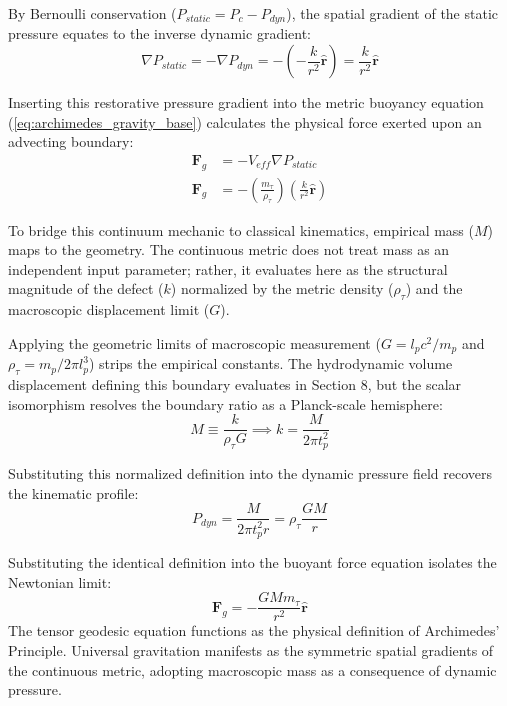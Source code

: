 By Bernoulli conservation ($P_{static} = P_c - P_{dyn}$), the spatial gradient of the static pressure equates to the inverse dynamic gradient:
\begin{equation}
    \nabla P_{static} = -\nabla P_{dyn} = - \left( -\frac{k}{r^2} \mathbf{\hat{r}} \right) = \frac{k}{r^2} \mathbf{\hat{r}}
\end{equation}

Inserting this restorative pressure gradient into the metric buoyancy equation (\ref{eq:archimedes_gravity_base}) calculates the physical force exerted upon an advecting boundary:
\begin{align}
    \mathbf{F}_g &= - V_{eff} \nabla P_{static} \nonumber \\
    \mathbf{F}_g &= - \left( \frac{m_\tau}{\rho_\tau} \right) \left( \frac{k}{r^2} \mathbf{\hat{r}} \right)
\end{align}

To bridge this continuum mechanic to classical kinematics, empirical mass ($M$) maps to the geometry. The continuous metric does not treat mass as an independent input parameter; rather, it evaluates here as the structural magnitude of the defect ($k$) normalized by the metric density ($\rho_\tau$) and the macroscopic displacement limit ($G$). 

Applying the geometric limits of macroscopic measurement ($G = l_p c^2 / m_p$ and $\rho_\tau = m_p / 2\pi l_p^3$) strips the empirical constants. The hydrodynamic volume displacement defining this boundary evaluates in Section 8, but the scalar isomorphism resolves the boundary ratio as a Planck-scale hemisphere:
\begin{equation}
    M \equiv \frac{k}{\rho_\tau G} \implies k = \frac{M}{2\pi t_p^2}
\end{equation}

Substituting this normalized definition into the dynamic pressure field recovers the kinematic profile: 
\begin{equation}
    P_{dyn} = \frac{M}{2\pi t_p^2 r} = \rho_\tau \frac{GM}{r} \label{eq:derived_pdyn}
\end{equation}

Substituting the identical definition into the buoyant force equation isolates the Newtonian limit:
\begin{equation}
    \mathbf{F}_g = - \frac{G M m_\tau}{r^2} \mathbf{\hat{r}} \label{eq:newtonian_limit}
\end{equation}
The tensor geodesic equation functions as the physical definition of Archimedes' Principle. Universal gravitation manifests as the symmetric spatial gradients of the continuous metric, adopting macroscopic mass as a consequence of dynamic pressure.


